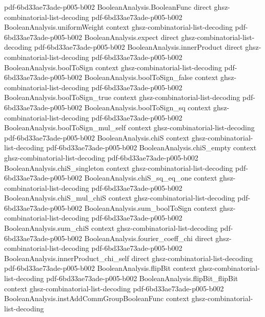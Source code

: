 \begin{lemma}
  {pdf-6bd33ae73ade-p005-b002}
\proofstep
  {BooleanAnalysis.BooleanFunc}
  {direct}
  {ghsz-combinatorial-list-decoding}
  {pdf-6bd33ae73ade-p005-b002}
\proofstep
  {BooleanAnalysis.uniformWeight}
  {context}
  {ghsz-combinatorial-list-decoding}
  {pdf-6bd33ae73ade-p005-b002}
\proofstep
  {BooleanAnalysis.expect}
  {direct}
  {ghsz-combinatorial-list-decoding}
  {pdf-6bd33ae73ade-p005-b002}
\proofstep
  {BooleanAnalysis.innerProduct}
  {direct}
  {ghsz-combinatorial-list-decoding}
  {pdf-6bd33ae73ade-p005-b002}
\proofstep
  {BooleanAnalysis.boolToSign}
  {context}
  {ghsz-combinatorial-list-decoding}
  {pdf-6bd33ae73ade-p005-b002}
\proofstep
  {BooleanAnalysis.boolToSign_false}
  {context}
  {ghsz-combinatorial-list-decoding}
  {pdf-6bd33ae73ade-p005-b002}
\proofstep
  {BooleanAnalysis.boolToSign_true}
  {context}
  {ghsz-combinatorial-list-decoding}
  {pdf-6bd33ae73ade-p005-b002}
\proofstep
  {BooleanAnalysis.boolToSign_sq}
  {context}
  {ghsz-combinatorial-list-decoding}
  {pdf-6bd33ae73ade-p005-b002}
\proofstep
  {BooleanAnalysis.boolToSign_mul_self}
  {context}
  {ghsz-combinatorial-list-decoding}
  {pdf-6bd33ae73ade-p005-b002}
\proofstep
  {BooleanAnalysis.chiS}
  {context}
  {ghsz-combinatorial-list-decoding}
  {pdf-6bd33ae73ade-p005-b002}
\proofstep
  {BooleanAnalysis.chiS_empty}
  {context}
  {ghsz-combinatorial-list-decoding}
  {pdf-6bd33ae73ade-p005-b002}
\proofstep
  {BooleanAnalysis.chiS_singleton}
  {context}
  {ghsz-combinatorial-list-decoding}
  {pdf-6bd33ae73ade-p005-b002}
\proofstep
  {BooleanAnalysis.chiS_sq_eq_one}
  {context}
  {ghsz-combinatorial-list-decoding}
  {pdf-6bd33ae73ade-p005-b002}
\proofstep
  {BooleanAnalysis.chiS_mul_chiS}
  {context}
  {ghsz-combinatorial-list-decoding}
  {pdf-6bd33ae73ade-p005-b002}
\proofstep
  {BooleanAnalysis.sum_boolToSign}
  {context}
  {ghsz-combinatorial-list-decoding}
  {pdf-6bd33ae73ade-p005-b002}
\proofstep
  {BooleanAnalysis.sum_chiS}
  {context}
  {ghsz-combinatorial-list-decoding}
  {pdf-6bd33ae73ade-p005-b002}
\proofstep
  {BooleanAnalysis.fourier_coeff_chi}
  {direct}
  {ghsz-combinatorial-list-decoding}
  {pdf-6bd33ae73ade-p005-b002}
\proofstep
  {BooleanAnalysis.innerProduct_chi_self}
  {direct}
  {ghsz-combinatorial-list-decoding}
  {pdf-6bd33ae73ade-p005-b002}
\proofstep
  {BooleanAnalysis.flipBit}
  {context}
  {ghsz-combinatorial-list-decoding}
  {pdf-6bd33ae73ade-p005-b002}
\proofstep
  {BooleanAnalysis.flipBit_flipBit}
  {context}
  {ghsz-combinatorial-list-decoding}
  {pdf-6bd33ae73ade-p005-b002}
\proofstep
  {BooleanAnalysis.instAddCommGroupBooleanFunc}
  {context}
  {ghsz-combinatorial-list-decoding}

\end{lemma}
